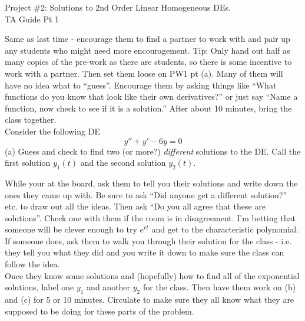 \documentclass[epsf]{article}
\begin{document}
\newcommand{\R}{\mathbb{R}}
\newcommand{\noi}{\noindent}
\newcommand{\bs}{\bigskip}



\begin{center}
{\Large Project \#2: Solutions to 2nd Order Linear Homogeneous DEs.\\
\vskip 2mm
TA Guide Pt 1}
\end{center}

\vskip 4mm

\noi {\bf 1} Same as last time - encourage them to find a partner to work with and pair up any students who might need more encouragement.  Tip: Only hand out half as many copies of the pre-work as there are students, so there is some incentive to work with a partner.  Then set them loose on PW1 pt (a).  Many of them will have no idea what to ``guess''.  Encourage them by asking things like ``What functions do you know that look like their own derivatives?'' or just say ``Name a function, now check to see if it is a solution.''  After about 10 minutes, bring the class together.\\




\noi{\bf PW 1}  Consider the following DE
$$ y'' + y' - 6y = 0$$
\noi (a) Guess and check to find two (or more?) \textit{different} solutions to the DE.  Call the first solution $y_1(t)$ and the second solution $y_2(t)$.
\vskip 2mm

\noi {\bf 2} While your at the board, ask them to tell you their solutions and write down the ones they came up with.  Be sure to ask ``Did anyone get a different solution?'' etc. to draw out all the ideas.  Then ask ``Do you all agree that these are solutions''.   Check one with them if the room is in disagreement.  I'm betting that someone will be clever enough to try $e^{rt}$ and get to the characteristic polynomial.  If someone does, ask them to walk you through their solution for the class - i.e. they tell you what they did and you write it down to make sure the class can follow the idea.\\

\noi {\bf 3} Once they know some solutions and (hopefully) how to find all of the exponential solutions, label one $y_1$ and another $y_2$ for the class.  Then have them work on (b) and (c) for 5 or 10 minutes.  Circulate to make sure they all know what they are supposed to be doing for these parts of the problem.\\
\end{document}
